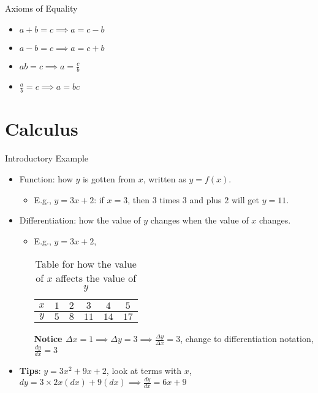 \documentclass{beamer}
\begin{document}
\begin{frame}[t]{Axioms of Equality}
    \begin{itemize}
        \item $a+b = c  \implies a = c - b$
	\item $a - b = c  \implies a = c + b$
	\item $ab = c  \implies a = \frac{c}{b} $
	\item $\frac{a}{b} = c  \implies a = bc$
    \end{itemize}
\end{frame}

\section{Calculus}%
\label{sec:calculus}

\begin{frame}[t]{Introductory Example}
    \begin{itemize}
	\item Function: how $y$ is gotten from $x$, written as $y = f\left( x \right) $.
	    \begin{itemize}
	        \item E.g.,  $y = 3x+2$: if $x=3$, then $3$ times  $3$ and plus $2$ will get $y=11$.
	    \end{itemize}
	\item Differentiation: how the value of $y$ changes when the value of $x$ changes.
	    \begin{itemize}
	        \item E.g., $y = 3x+2$,
		    \begin{table}[htpb]
		        \centering
		        \caption{Table for how the value of $x$ affects the value of $y$}
		        \label{tab:Table-for-how-the-value-of-x-affects-the-value-of-y-}
		        \begin{tabular}{cccccc}
			    $x$ & $1$ &  $2$ &  $3$ & $4$ & $5$ \\
			    \hline
			    $y$ & $5$ & $8$ & $11$ & $14$ & $17$ \\
		        \end{tabular}
		    \end{table}
		    \textbf{Notice $ \Delta x = 1 \implies  \Delta y = 3  \implies  \frac{ \Delta y}{ \Delta x} = 3 $}, change to differentiation notation, $\frac{dy}{dx}  = 3$
	    \end{itemize}
	\item  \textbf{Tips}: $y = 3x^{2} + 9x  + 2 $, look at terms with $x$,  $dy = 3 \times 2 x\left( dx \right) + 9 \left( dx \right)   \implies \frac{dy}{dx} = 6x+9  $
    \end{itemize}
\end{frame}
\end{document}
